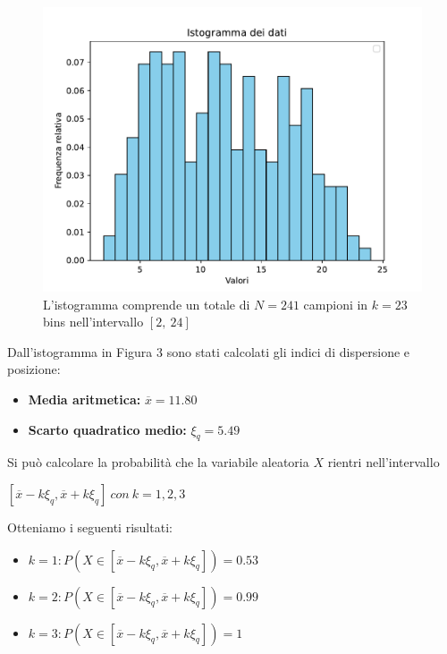 \begin{figure}[H]
	\centering
	\includegraphics[width=1\textwidth]{istogramma2.pdf}
	\caption{L'istogramma comprende un totale di $N=241$ campioni in $k=23$ bins nell'intervallo $[2,\ 24]$}
\end{figure}

Dall'istogramma in Figura 3 sono stati calcolati gli indici di dispersione e posizione:
\begin{itemize}
	\item \textbf{Media aritmetica:} $\overline{x}=11.80$
	\item \textbf{Scarto quadratico medio:} $\xi_q=5.49$
\end{itemize}

Si può calcolare la probabilità che la variabile aleatoria $X$ rientri nell'intervallo
\begin{center}
	$[\overline{x}-k\xi_q, \overline{x}+k\xi_q]\ con\ k=1,2,3$
\end{center}

Otteniamo i seguenti risultati:
\begin{itemize}
	\item $k=1: P(X \in [\overline{x}-k\xi_q, \overline{x}+k\xi_q])=0.53$
	\item $k=2: P(X \in [\overline{x}-k\xi_q, \overline{x}+k\xi_q])=0.99$
	\item $k=3: P(X \in [\overline{x}-k\xi_q, \overline{x}+k\xi_q])=1$
\end{itemize}
 
